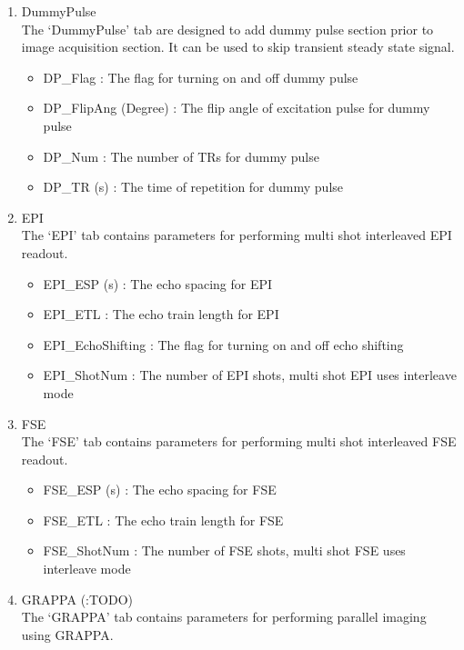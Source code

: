 \documentclass{book}%
\begin{document}
\begin{enumerate}
	\item DummyPulse \\
	The `DummyPulse' tab are designed to add dummy pulse section prior to image acquisition section. It can be used to skip transient steady state signal.
		\begin{itemize}
			\item DP\_Flag : The flag for turning on and off dummy pulse
			\item DP\_FlipAng (Degree) : The flip angle of excitation pulse for dummy pulse
			\item DP\_Num : The number of TRs for dummy pulse
			\item DP\_TR (s) : The time of repetition for dummy pulse
		\end{itemize}
	
  \item	EPI \\
	The `EPI' tab contains parameters for performing multi shot interleaved EPI readout.
		\begin{itemize}
			\item EPI\_ESP (s) : The echo spacing for EPI
			\item EPI\_ETL : The echo train length for EPI
			\item EPI\_EchoShifting : The flag for turning on and off echo shifting
			\item EPI\_ShotNum : The number of EPI shots, multi shot EPI uses interleave mode
		\end{itemize}
		
	\item FSE \\
	The `FSE' tab contains parameters for performing multi shot interleaved FSE readout.
		\begin{itemize}
			\item FSE\_ESP (s) : The echo spacing for FSE
			\item FSE\_ETL : The echo train length for FSE
			\item FSE\_ShotNum : The number of FSE shots, multi shot FSE uses interleave mode
		\end{itemize}
		
  \item GRAPPA (:TODO) \\
	The `GRAPPA' tab contains parameters for performing parallel imaging using GRAPPA.
	

\end{enumerate}
\end{document}
